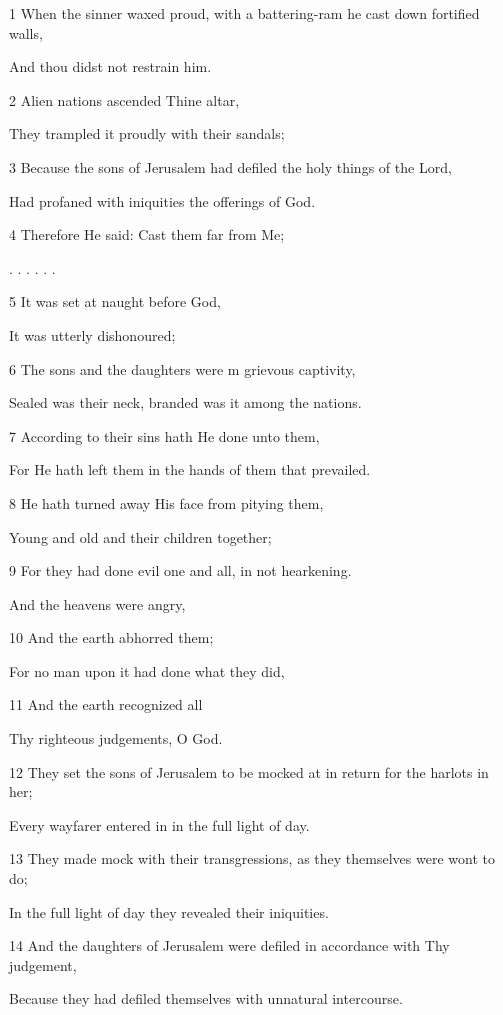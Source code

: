 \par 1 When the sinner waxed proud, with a battering-ram he cast down fortified walls,
\par  And thou didst not restrain him.
\par 2 Alien nations ascended Thine altar,
\par  They trampled it proudly with their sandals;
\par 3 Because the sons of Jerusalem had defiled the holy things of the Lord,
\par  Had profaned with iniquities the offerings of God.
\par 4 Therefore He said: Cast them far from Me;
\par    .       .       .       .       .       .
\par 5 It was set at naught before God,
\par  It was utterly dishonoured;
\par 6 The sons and the daughters were m grievous captivity,
\par  Sealed was their neck, branded was it among the nations.
\par 7 According to their sins hath He done unto them,
\par  For He hath left them in the hands of them that prevailed.
\par 8 He hath turned away His face from pitying them,
\par  Young and old and their children together;
\par 9 For they had done evil one and all, in not hearkening.
\par  And the heavens were angry,
\par 10 And the earth abhorred them;
\par  For no man upon it had done what they did,
\par 11 And the earth recognized all
\par  Thy righteous judgements, O God.
\par 12 They set the sons of Jerusalem to be mocked at in return for the harlots in her;
\par  Every wayfarer entered in in the full light of day.
\par 13 They made mock with their transgressions, as they themselves were wont to do;
\par  In the full light of day they revealed their iniquities.
\par 14 And the daughters of Jerusalem were defiled in accordance with Thy judgement,
\par  Because they had defiled themselves with unnatural intercourse.
